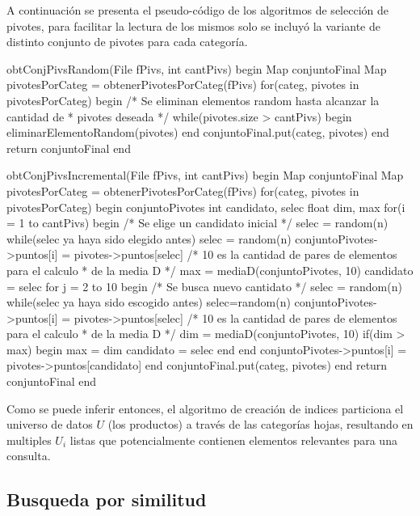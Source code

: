 A continuaci\'on se presenta el pseudo-c\'odigo de los algoritmos de selecci\'on de pivotes, para facilitar la lectura de los mismos solo se incluy\'o la variante de distinto conjunto de pivotes para cada categor\'ia.

\begin{algorithm}[caption={Selecci\'on de pivotes random}, label={alg2}]
obtConjPivsRandom(File fPivs, int cantPivs)
begin
 Map conjuntoFinal
 Map pivotesPorCateg = obtenerPivotesPorCateg(fPivs)
 for(categ, pivotes in pivotesPorCateg)
 begin
  /* Se eliminan elementos random hasta alcanzar la cantidad de 
   * pivotes deseada */
  while(pivotes.size > cantPivs)
  begin
   eliminarElementoRandom(pivotes)
  end
  conjuntoFinal.put(categ, pivotes)
 end
 return conjuntoFinal
end
\end{algorithm}

\begin{algorithm}[caption={Selecci\'on de pivotes incremental}, label={alg3}]
obtConjPivsIncremental(File fPivs, int cantPivs)
begin
 Map conjuntoFinal
 Map pivotesPorCateg = obtenerPivotesPorCateg(fPivs)
 for(categ, pivotes in pivotesPorCateg)
 begin
  conjuntoPivotes
  int candidato, selec
  float dim, max
  for(i = 1 to cantPivs)
  begin
   /* Se elige un candidato inicial */ 
   selec = random(n)
   while(selec ya haya sido elegido antes)
    selec = random(n)
   conjuntoPivotes->puntos[i] = pivotes->puntos[selec]
   /* 10 es la cantidad de pares de elementos para el calculo
    * de la media D */
   max = mediaD(conjuntoPivotes, 10)
   candidato = selec
   for j = 2 to 10
    begin
    /* Se busca nuevo cantidato */
    selec = random(n)
    while(selec ya haya sido escogido antes)
     selec=random(n)
    conjuntoPivotes->puntos[i] = pivotes->puntos[selec]
    /* 10 es la cantidad de pares de elementos para el calculo 
     * de la media D */
    dim = mediaD(conjuntoPivotes, 10)
    if(dim > max)
    begin
     max = dim
     candidato = selec
    end
   end
   conjuntoPivotes->puntos[i] = pivotes->puntos[candidato]
  end
  conjuntoFinal.put(categ, pivotes)
 end
 return conjuntoFinal
end
\end{algorithm}

Como se puede inferir entonces, el algoritmo de creaci\'on de indices particiona el universo de datos $U$ (los productos) a trav\'es de las categor\'ias hojas, resultando en multiples $U_i$ listas que potencialmente contienen elementos relevantes para una consulta.\\

\subsection{Busqueda por similitud}

